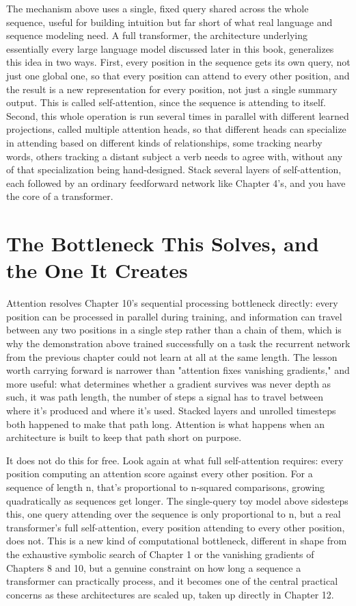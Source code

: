 The mechanism above uses a single, fixed query shared across the whole sequence, useful for building intuition but far short of what real language and sequence modeling need. A full transformer, the architecture underlying essentially every large language model discussed later in this book, generalizes this idea in two ways. First, every position in the sequence gets its own query, not just one global one, so that every position can attend to every other position, and the result is a new representation for every position, not just a single summary output. This is called self-attention, since the sequence is attending to itself. Second, this whole operation is run several times in parallel with different learned projections, called multiple attention heads, so that different heads can specialize in attending based on different kinds of relationships, some tracking nearby words, others tracking a distant subject a verb needs to agree with, without any of that specialization being hand-designed. Stack several layers of self-attention, each followed by an ordinary feedforward network like Chapter 4's, and you have the core of a transformer.

\section*{The Bottleneck This Solves, and the One It Creates}

Attention resolves Chapter 10's sequential processing bottleneck directly: every position can be processed in parallel during training, and information can travel between any two positions in a single step rather than a chain of them, which is why the demonstration above trained successfully on a task the recurrent network from the previous chapter could not learn at all at the same length. The lesson worth carrying forward is narrower than "attention fixes vanishing gradients," and more useful: what determines whether a gradient survives was never depth as such, it was path length, the number of steps a signal has to travel between where it's produced and where it's used. Stacked layers and unrolled timesteps both happened to make that path long. Attention is what happens when an architecture is built to keep that path short on purpose.

It does not do this for free. Look again at what full self-attention requires: every position computing an attention score against every other position. For a sequence of length n, that's proportional to n-squared comparisons, growing quadratically as sequences get longer. The single-query toy model above sidesteps this, one query attending over the sequence is only proportional to n, but a real transformer's full self-attention, every position attending to every other position, does not. This is a new kind of computational bottleneck, different in shape from the exhaustive symbolic search of Chapter 1 or the vanishing gradients of Chapters 8 and 10, but a genuine constraint on how long a sequence a transformer can practically process, and it becomes one of the central practical concerns as these architectures are scaled up, taken up directly in Chapter 12.

